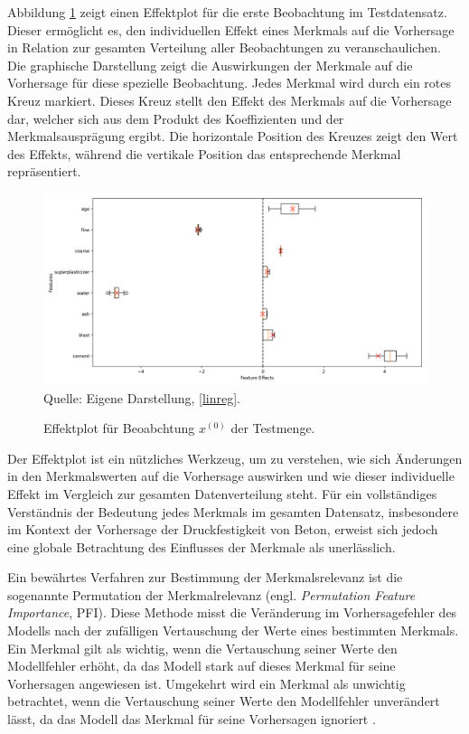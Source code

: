 Abbildung \ref{pic:effect} zeigt einen Effektplot für die erste Beobachtung im Testdatensatz. Dieser 
ermöglicht es, den individuellen Effekt eines Merkmals auf die Vorhersage in Relation zur gesamten 
Verteilung aller Beobachtungen zu veranschaulichen. Die graphische Darstellung zeigt die Auswirkungen 
der Merkmale auf die Vorhersage für diese spezielle Beobachtung. 
Jedes Merkmal wird durch ein rotes Kreuz markiert. Dieses Kreuz stellt den Effekt des Merkmals auf die Vorhersage dar, 
welcher sich aus dem Produkt des Koeffizienten und der Merkmalsausprägung ergibt.
Die horizontale Position des Kreuzes zeigt den Wert des Effekts, während die vertikale Position das entsprechende Merkmal repräsentiert.

\begin{figure}[!h]
    \caption{Effektplot für Beoabchtung $x^{(0)}$ der Testmenge.}
    \includegraphics[width=1\textwidth]{../scripts/images/feature_effects_boxplot.png}
    Quelle: Eigene Darstellung, \ref{linreg}.
    \label{pic:effect}
\end{figure}

Der Effektplot ist ein nützliches Werkzeug, um zu verstehen, wie sich Änderungen in den Merkmalswerten auf die Vorhersage 
auswirken und wie dieser individuelle Effekt im Vergleich zur gesamten Datenverteilung steht. Für ein vollständiges Verständnis 
der Bedeutung jedes Merkmals im gesamten Datensatz, insbesondere im Kontext der Vorhersage der Druckfestigkeit von Beton, 
erweist sich jedoch eine globale Betrachtung des Einflusses der Merkmale als unerlässlich.

Ein bewährtes Verfahren zur Bestimmung der 
Merkmalsrelevanz ist die sogenannte Permutation der Merkmalrelevanz (engl. \textit{Permutation Feature Importance}, PFI). 
Diese Methode misst die Veränderung im Vorhersagefehler des Modells nach der 
zufälligen Vertauschung der Werte eines bestimmten Merkmals. 
Ein Merkmal gilt als wichtig, wenn die Vertauschung seiner Werte den Modellfehler erhöht, 
da das Modell stark auf dieses Merkmal für seine Vorhersagen angewiesen ist. 
Umgekehrt wird ein Merkmal als unwichtig betrachtet, wenn die Vertauschung seiner Werte 
den Modellfehler unverändert lässt, da das Modell das Merkmal für seine Vorhersagen ignoriert \cite[S. 157]{Molnar_2022}. 

